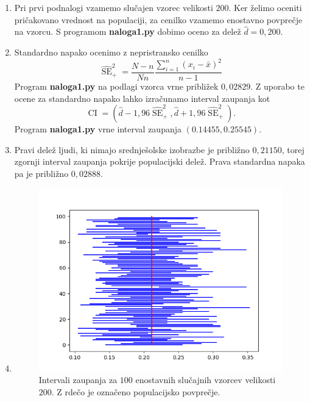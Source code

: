 \documentclass{article}
\DeclareMathOperator{\se}{SE}
\DeclareMathOperator{\ci}{CI}
\begin{document}
\begin{enumerate}[label=\alph*)]
    \item Pri prvi podnalogi vzamemo slučajen vzorec velikosti $200$. Ker želimo
        oceniti pričakovano vrednost na populaciji, za cenilko vzamemo enostavno
        povprečje na vzorcu. S programom \textbf{naloga1.py} dobimo oceno za
        delež $\hat{d} = 0{,}200$.
    \item Standardno napako ocenimo z nepristransko cenilko
        \[
            \widehat{\se}_+^2 = \frac{N - n}{N n} \frac{\sum_{i=1}^{n} (x_i -
            \bar{x})^2}{n - 1}
        \]
        Program \textbf{naloga1.py} na podlagi vzorca vrne približek
        $0{,}02829$. Z uporabo te ocene za standardno napako lahko izračunamo
        interval zaupanja kot
        \[
            \ci = (\hat{d} - 1{,}96 \widehat{\se}_+^2, \hat{d} + 1{,}96
            \widehat{\se}_+^2).
        \]
        Program \textbf{naloga1.py} vrne interval zaupanja $(0.14455, 0.25545)$.
    \item Pravi delež ljudi, ki nimajo srednješolske izobrazbe je približno
        $0{,}21150$, torej zgornji interval zaupanja pokrije populacijski delež.
        Prava standardna napaka pa je približno $0{,}02888$.
    \item
        \begin{figure}[H]
            \centering
            \includegraphics[scale=0.5]{1d.png}
            \caption{Intervali zaupanja za $100$ enostavnih slučajnih vzorcev
            velikosti $200$. Z rdečo je označeno populacijsko povprečje.}
            \label{slika 1d}
        \end{figure}

\end{enumerate}
\end{document}
